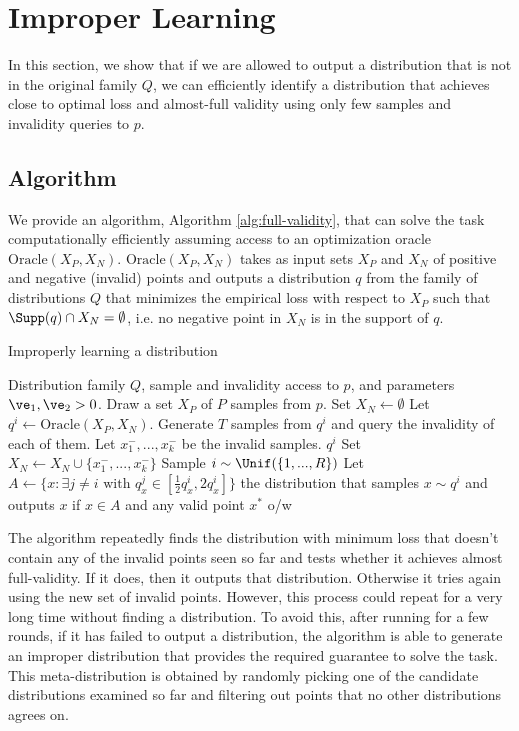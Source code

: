 \section{Improper Learning}
\label{sec:improper}

In this section, we show that if we are allowed to output a distribution that is not in the original family $Q$, we can efficiently identify a distribution that achieves close to optimal loss and almost-full validity using only few samples and invalidity queries to $p$.

\subsection{Algorithm}

We provide an algorithm, Algorithm \ref{alg:full-validity}, that can solve the task computationally efficiently assuming access to an optimization oracle $\text{Oracle}(X_P,X_N)$. $\text{Oracle}(X_P,X_N)$ takes as input sets $X_P$ and $X_N$ of positive and negative (invalid) points and outputs a distribution $q$ from the family of distributions $Q$ that minimizes the empirical loss with respect to $X_P$ such that $\Supp(q) \cap X_N = \emptyset$, i.e. no negative point in $X_N$ is in the support of $q$.

\begin{algorithm}[ht]
   \caption{Improperly learning a distribution}
   \label{alg:full-validity}
\begin{algorithmic}[1]
    Distribution family $Q$, sample and invalidity access to $p$, and parameters $\ve_1, \ve_2 > 0$.
   \STATE Draw a set $X_P$ of $P$ samples from $p$.
   \STATE Set $X_N \leftarrow \emptyset$
     \STATE Let $q^i \leftarrow \text{Oracle}(X_P,X_N)$.
     \STATE Generate $T$ samples from $q^i$ and query the invalidity of each of them.
     \STATE Let $x^-_1,...,x^-_k$ be the invalid samples.
        \RETURN $q^i$
     \ELSE
       \STATE Set $X_N \leftarrow X_N \cup \{x^-_1,...,x^-_k\}$
     \ENDIF
   \ENDFOR
   \STATE Sample $i \sim \Unif(\{1,...,R\})$
   \STATE Let $A \leftarrow {\{x: \exists j \neq i \text{ with } q^j_x \in [\frac12 q^i_x,2 q^i_x]\}}$
   \RETURN the distribution that samples $x \sim q^i$ and outputs $x$ if $x \in A$ and any valid point $x^*$ o/w
\end{algorithmic}
\end{algorithm}

The algorithm repeatedly finds the distribution with minimum loss that doesn't contain any of the invalid points seen so far and tests whether it achieves almost full-validity. If it does, then it outputs that distribution. Otherwise it tries again using the new set of invalid points. However, this process could repeat for a very long time without finding a distribution. To avoid this, after running for a few rounds, if it has failed to output a distribution, the algorithm is able to generate an improper distribution that provides the required guarantee to solve the task. This meta-distribution is obtained by randomly picking one of the candidate distributions examined so far and filtering out points that no other distributions agrees on.

